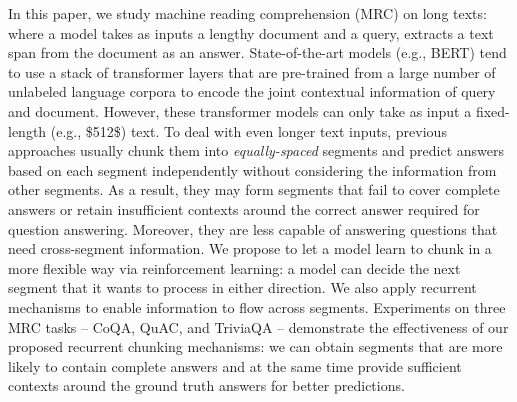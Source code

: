 In this paper, we study machine reading comprehension (MRC) on long texts: where a model takes as inputs a lengthy document and a query, extracts a text span from the document as an answer. State-of-the-art models (e.g., BERT) tend to use a stack of transformer layers that are pre-trained from a large number of unlabeled language corpora to encode the joint contextual information of query and document. However, these transformer models can only take as input a fixed-length (e.g., \$512\$) text. To deal with even longer text inputs, previous approaches usually chunk them into \emph{equally-spaced} segments and predict answers based on each segment independently without considering the information from other segments. As a result, they may form segments that fail to cover complete answers or retain insufficient contexts around the correct answer required for question answering. Moreover, they are less capable of answering questions that need cross-segment information. We propose to let a model learn to chunk in a more flexible way via reinforcement learning: a model can decide the next segment that it wants to process in either direction. We also apply recurrent mechanisms to enable information to flow across segments. Experiments on three MRC tasks -- CoQA, QuAC, and TriviaQA -- demonstrate the effectiveness of our proposed recurrent chunking mechanisms: we can obtain segments that are more likely to contain complete answers and at the same time provide sufficient contexts around the ground truth answers for better predictions.

